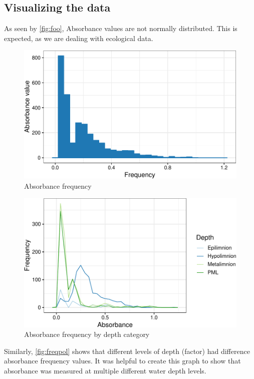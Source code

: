 \documentclass[12pt,]{article}
\begin{document}
\subsection{Visualizing the data}\label{visualizing-the-data}

As seen by \autoref{fig:foo}, Absorbance values are not normally
distributed. This is expected, as we are dealing with ecological data.

\begin{figure}
\centering
\includegraphics{Bash_ENV872_Project_files/figure-latex/foo-1.pdf}
\caption{\label{fig:foo}Absorbance frequency}
\end{figure}

\begin{figure}
\centering
\includegraphics{Bash_ENV872_Project_files/figure-latex/freqpol-1.pdf}
\caption{\label{fig:freqpol}Absorbance frequency by depth category}
\end{figure}

Similarly, \autoref{fig:freqpol} shows that different levels of depth
(factor) had difference absorbance frequency values. It was helpful to
create this graph to show that absorbance was measured at multiple
different water depth levels.
\end{document}
